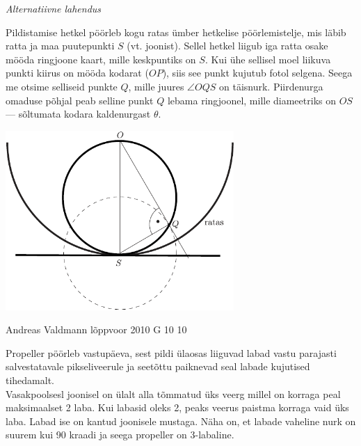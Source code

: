\documentclass[11pt, twoside]{article}
\begin{document}
{{\vspace{0.5\baselineskip}

\textit{Alternatiivne lahendus}

Pildistamise hetkel pöörleb kogu ratas ümber hetkelise pöörlemistelje, mis läbib
ratta ja maa puutepunkti $S$ (vt. joonist). Sellel hetkel liigub iga ratta osake
mööda ringjoone kaart, mille keskpuntiks on $S$. Kui ühe sellisel moel liikuva
punkti kiirus on mööda kodarat ($OP$), siis see punkt kujutub fotol selgena.
Seega me otsime selliseid punkte $Q$, mille juures $\angle OQS$ on täisnurk.
Piirdenurga omaduse põhjal peab selline punkt $Q$ lebama ringjoonel, mille
diameetriks on $OS$ --- sõltumata kodara kaldenurgast $\theta$.
\begin{center}
	\includegraphics[width=0.65\textwidth]{2011-lahg-10-kodar_b}
\end{center}
\fi
}

{Andreas Valdmann} %
{lõppvoor} %
{2010} %
{G 10} %
{10} %
{

\ifSolution
\osa Propeller pöörleb vastupäeva, sest pildi ülaosas liiguvad labad vastu parajasti salvestatavale pikseliveerule ja seetõttu paiknevad seal labade kujutised tihedamalt.\\
\osa Vasakpoolsesl joonisel on ülalt alla tõmmatud üks veerg millel on korraga peal maksimaalset 2 laba. Kui labasid oleks 2, peaks veerus paistma korraga vaid üks laba. Labad ise on kantud joonisele mustaga. Näha on, et labade vaheline nurk on suurem kui 90 kraadi ja seega propeller on 3-labaline.

}}
\end{document}
